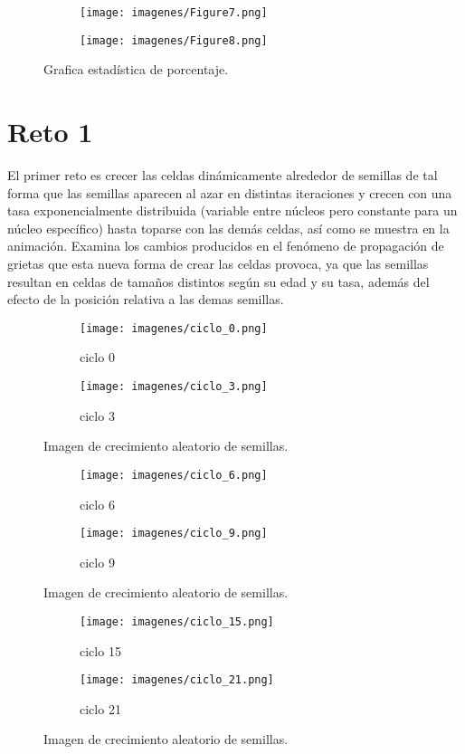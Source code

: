 \documentclass{article}
\begin{document}
\begin{figure}[H]
\centering
\begin{subfigure}[b]{0.50\linewidth}
\texttt{[image: imagenes/Figure7.png]}
\caption{}
\end{subfigure}
\begin{subfigure}[b]{0.50\linewidth}
\texttt{[image: imagenes/Figure8.png]}
\caption{}
\end{subfigure}
\caption{Grafica estadística de porcentaje.}
\label{fig:westminster}
\end{figure}


\newpage
\section{Reto 1}
El primer reto es crecer las celdas dinámicamente alrededor de semillas de tal forma que las semillas aparecen al azar en distintas iteraciones y crecen con una tasa exponencialmente distribuida (variable entre núcleos pero constante para un núcleo específico) hasta toparse con las demás celdas, así como se muestra en la animación. Examina los cambios producidos en el fenómeno de propagación de grietas que esta nueva forma de crear las celdas provoca, ya que las semillas resultan en celdas de tamaños distintos según su edad y su tasa, además del efecto de la posición relativa a las demas semillas.

 \begin{figure}[H]
\centering
\begin{subfigure}[b]{0.35\linewidth}
\texttt{[image: imagenes/ciclo\_0.png]}
\caption{ciclo 0}
\end{subfigure}
\begin{subfigure}[b]{0.35\linewidth}
\texttt{[image: imagenes/ciclo\_3.png]}
\caption{ciclo 3}
\end{subfigure}
\caption{Imagen de crecimiento aleatorio de semillas.}
\label{fig:westminster}
\end{figure}


 \begin{figure}[H]
\centering
\begin{subfigure}[b]{0.35\linewidth}
\texttt{[image: imagenes/ciclo\_6.png]}
\caption{ciclo 6}
\end{subfigure}
\begin{subfigure}[b]{0.35\linewidth}
\texttt{[image: imagenes/ciclo\_9.png]}
\caption{ciclo 9}
\end{subfigure}
\caption{Imagen de crecimiento aleatorio de semillas.}
\label{fig:westminster}
\end{figure}
 \begin{figure}[H]
\centering
\begin{subfigure}[b]{0.35\linewidth}
\texttt{[image: imagenes/ciclo\_15.png]}
\caption{ciclo 15}
\end{subfigure}
\begin{subfigure}[b]{0.35\linewidth}
\texttt{[image: imagenes/ciclo\_21.png]}
\caption{ciclo 21}
\end{subfigure}
\caption{Imagen de crecimiento aleatorio de semillas.}
\label{fig:westminster}
\end{figure}
\end{document}
